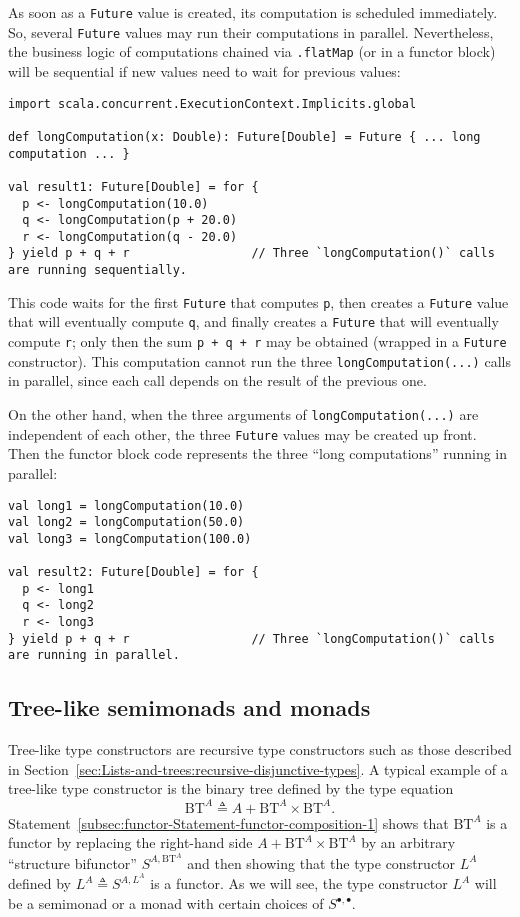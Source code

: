 As soon as a \lstinline!Future! value is created, its computation
is scheduled immediately. So, several \lstinline!Future! values may
run their computations in parallel. Nevertheless, the business logic
of computations chained via \lstinline!.flatMap! (or in a functor
block) will be sequential if new values need to wait for previous
values:
\begin{lstlisting}
import scala.concurrent.ExecutionContext.Implicits.global

def longComputation(x: Double): Future[Double] = Future { ... long computation ... }

val result1: Future[Double] = for {
  p <- longComputation(10.0)
  q <- longComputation(p + 20.0)
  r <- longComputation(q - 20.0)
} yield p + q + r                 // Three `longComputation()` calls are running sequentially.
\end{lstlisting}
This code waits for the first \lstinline!Future! that computes \lstinline!p!,
then creates a \lstinline!Future! value that will eventually compute
\lstinline!q!, and finally creates a \lstinline!Future! that will
eventually compute \lstinline!r!; only then the sum \lstinline!p + q + r!
may be obtained (wrapped in a \lstinline!Future! constructor). This
computation cannot run the three \lstinline!longComputation(...)!
calls in parallel, since each call depends on the result of the previous
one.

On the other hand, when the three arguments of \lstinline!longComputation(...)!
are independent of each other, the three \lstinline!Future! values
may be created up front. Then the functor block code represents the
three \textsf{``}long computations\textsf{''} running in parallel:
\begin{lstlisting}
val long1 = longComputation(10.0)
val long2 = longComputation(50.0)
val long3 = longComputation(100.0)

val result2: Future[Double] = for {
  p <- long1
  q <- long2
  r <- long3
} yield p + q + r                 // Three `longComputation()` calls are running in parallel.
\end{lstlisting}


\subsection{Tree-like semimonads and monads}

Tree-like type constructors are recursive type constructors such as
those described in Section~\ref{sec:Lists-and-trees:recursive-disjunctive-types}.
A typical example of a tree-like type constructor is the binary tree
defined by the type equation
\[
\text{BT}^{A}\triangleq A+\text{BT}^{A}\times\text{BT}^{A}.
\]
Statement~\ref{subsec:functor-Statement-functor-composition-1} shows
that $\text{BT}^{A}$ is a functor by replacing the right-hand side
$A+\text{BT}^{A}\times\text{BT}^{A}$ by an arbitrary \textsf{``}structure
bifunctor\textsf{''} $S^{A,\text{BT}^{A}}$ and then showing that the type
constructor $L^{A}$ defined by $L^{A}\triangleq S^{A,L^{A}}$ is
a functor. As we will see, the type constructor $L^{A}$ will be a
semimonad or a monad with certain choices of $S^{\bullet,\bullet}$.

